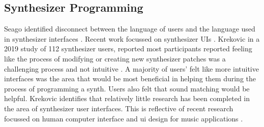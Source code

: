 \subsection{Synthesizer Programming}
Seago identified disconnect between the language of users and the language used in synthesizer interfaces \cite{seago2004critical}. Recent work focussed on synthesizer UIs \cite{rasmussen2018evaluating}. Krekovic in a 2019 study of 112 synthesizer users, reported most participants reported feeling like the process of modifying or creating new synthesizer patches was a challenging process and not intuitive \cite{krekovic2019insights}. A majority of users' felt like more intuitive interfaces was the area that would be most beneficial in helping them during the process of programming a synth. Users also felt that sound matching would be helpful. Krekovic identifies that relatively little research has been completed in the area of synthesizer user interfaces. This is reflective of recent research focussed on human computer interface and ui design for music applications \cite{pardo2019learning}\cite{knees2019intelligent}.